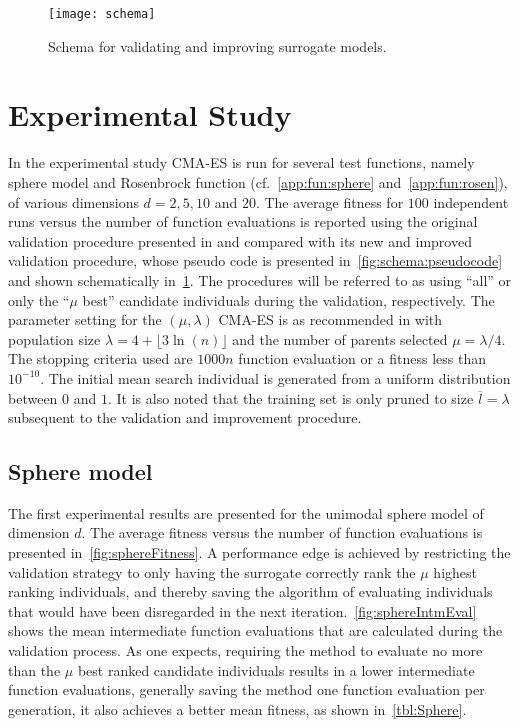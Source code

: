 \begin{figure} \centering 
\texttt{[image: schema]}
\caption{Schema for validating and improving surrogate models.}\label{fig:schema} 
\end{figure}


\section{Experimental Study}\label{sec:sur:expr}
In the experimental study CMA-ES  is run for several test functions, namely sphere model and Rosenbrock function (cf.~\cref{app:fun:sphere} and~\cref{app:fun:rosen}), of various dimensions $d=2,5,10$ and $20$. The average fitness for $100$ independent runs versus the number of function evaluations is reported using the original validation procedure presented in \cite{Ru06:PPSN} and compared with its new and improved validation procedure, whose pseudo code is presented in~\cref{fig:schema:pseudocode} and shown schematically in~\cref{fig:schema}. The procedures will be referred to as using ``all'' or only the ``$\mu$ best'' candidate individuals during the validation, respectively.
The parameter setting for the $(\mu,\lambda)$ CMA-ES is as recommended in \cite{Hansen01} with population size $\lambda = 4+\lfloor 3\ln(n)\rfloor$ and the number of parents selected $\mu=\lambda/4$. The stopping criteria used are $1000n$ function evaluation or a fitness less than $10^{-10}$. The initial mean search individual is generated from a uniform distribution between $0$ and $1$. It is also noted that the training set is only pruned to size $\overline{l} = \lambda$ subsequent to the validation and improvement procedure.

\subsection{Sphere model}\label{sec:sphere}
The first experimental results are presented for the unimodal sphere model of dimension $d$.  
The average fitness versus the number of function evaluations is presented in~\cref{fig:sphereFitness}. A performance edge is achieved by restricting the validation strategy to only having the surrogate correctly rank the $\mu$ highest ranking individuals, and thereby saving the algorithm of evaluating individuals  that would have been disregarded in the next iteration.~\cref{fig:sphereIntmEval} shows the mean intermediate function evaluations that are calculated during the validation process. As one expects, requiring the method to evaluate no more than the $\mu$ best ranked candidate individuals results in a lower intermediate function evaluations, generally saving the method one function evaluation per generation, it also achieves a better mean fitness, as shown in~\cref{tbl:Sphere}.


